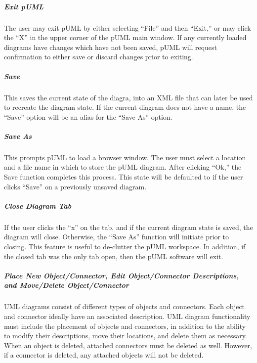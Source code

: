\documentclass[twoside,letterpaper]{article}
\begin{document}
\subparagraph{Exit pUML}
{ The user may exit pUML by either selecting ``File'' and then ``Exit,'' or may click the ``X'' in the upper corner of the pUML main window. If any currently loaded diagrams have changes which have not been saved, pUML will request confirmation to either save or discard changes prior to exiting. }

\subparagraph{Save}
{ This saves the current state of the diagra, into an XML file that can later be used to recreate the diagram state. If the current diagram does not have a name, the ``Save'' option will be an alias for the ``Save As'' option.}

\subparagraph{Save As}
{ This prompts pUML to load a browser window. The user must select a location and a file name in which to store the pUML diagram.  After clicking ``Ok,'' the Save function completes this process.  This state will be defaulted to if the user clicks ``Save'' on a previously unsaved diagram.}

\subparagraph{Close Diagram Tab}
{ If the user clicks the ``x'' on the tab, and if the current diagram state is saved, the diagram will close. Otherwise, the ``Save As'' function will initiate prior to closing. This feature is useful to de-clutter the pUML workspace. In addition, if the closed tab was the only tab open, then the pUML software will exit.}

\subparagraph{Place New Object/Connector, Edit Object/Connector Descriptions, and Move/Delete Object/Connector}
{ UML diagrams consist of different types of objects and connectors. Each object and connector ideally have an associated description. UML diagram functionality must include the placement of objects and connectors, in addition to the ability to modify their descriptions, move their locations, and delete them as necessary. When an object is deleted, attached connectors must be deleted as well. However, if a connector is deleted, any attached objects will not be deleted. }




\clearpage\setcounter{page}{1}\pagestyle{Convertvi}
\end{document}

